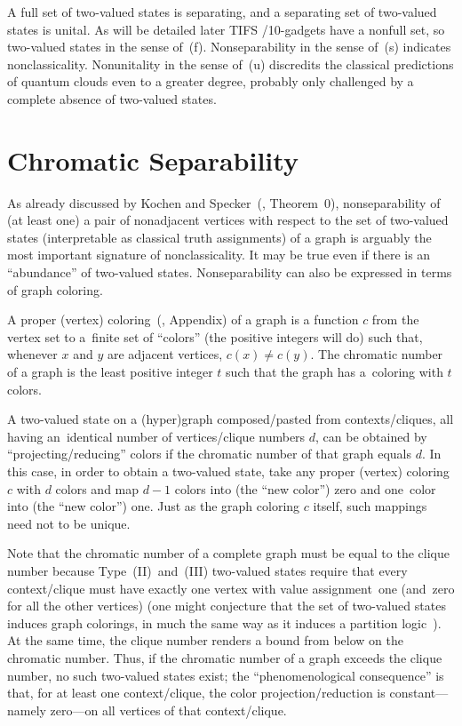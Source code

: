 A full set of
two-valued states is separating,
and a separating set of
two-valued states is unital.
As will be detailed later TIFS%
/10-gadgets have a nonfull set, so two-valued states in the sense of~(f).
Nonseparability in the sense of~(s) indicates nonclassicality.
Nonunitality in the sense of~(u) discredits the classical predictions of quantum clouds
even to a greater degree, probably only challenged by a complete absence of two-valued states.


\section{Chromatic Separability}

As already discussed by Kochen and Specker~(\cite{Kochen1}, Theorem~0),
nonseparability of (at least one) a pair of nonadjacent vertices
with respect to the set of two-valued states
(interpretable as classical truth assignments) of a graph
is arguably the most important signature of nonclassicality.
It may be true even if there is an ``abundance'' of two-valued states.
Nonseparability can also be expressed in terms of graph coloring.

 A proper (vertex)
coloring~(\cite{Godsil-Newman-2008}, Appendix) of a graph is a function $c$ from the vertex set to a~finite
set of ``colors'' (the positive integers will do) such that,
whenever $x$ and $y$ are adjacent vertices,
$c(x) \neq c(y)$.
The chromatic number of a graph is the least positive integer $t$ such
that the graph has a~coloring with $t$ colors.


A two-valued state on a (hyper)graph composed/pasted from contexts/cliques,
all having an~identical
number of vertices/clique numbers $d$, can be obtained by ``projecting/reducing'' colors
if the chromatic number of that graph equals $d$.
In this case, in order to obtain a two-valued state,
take any proper (vertex) coloring $c$ with $d$ colors
and map $d-1$ colors into (the ``new color'') zero and one~color into (the ``new color'') one.
Just as the graph coloring $c$ itself, such mappings need not to be unique.

Note that the chromatic number of a complete graph must be equal to the clique number
because Type~(II)~{and}~(III) two-valued states require that every context/clique
must have exactly one vertex with value assignment~one (and~zero for all the other vertices)
(one might conjecture that the set of two-valued states
induces graph colorings, in much the same way as it induces a partition logic~\cite{svozil-2001-eua}).
At the same time, the clique number renders a bound from below on the chromatic number.
Thus, if the chromatic number of a graph exceeds the clique number,
no such two-valued states exist; the ``phenomenological consequence'' is that, for at least one context/clique,
the color projection/reduction is constant---namely zero---on all vertices of that context/clique.



